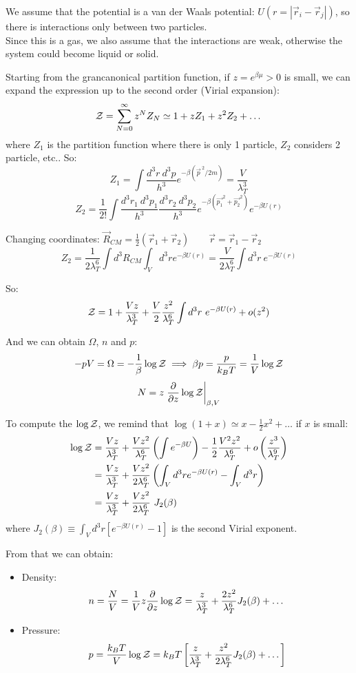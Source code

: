 We assume that the potential is a van der Waals potential: $U(r = |\vec r_i - \vec r_j|)$, so there is interactions only between two particles.\\
Since this is a gas, we also assume that the interactions are weak, otherwise the system could become liquid or solid.

Starting from the grancanonical partition function, if $z = e^{\beta \mu} > 0$ is small, we can expand the expression up to the second order (Virial expansion):
$$\mathcal{Z} = \sum_{N=0}^\infty z^N Z_N \simeq 1+ zZ_1 + z^2 Z_2 + \dots$$
where $Z_1$ is the partition function where there is only 1 particle, $Z_2$ considers 2 particle, etc.. So:
$$ Z_1 = \int \frac{d^3r\ d^3p}{h^3} e^{-\beta({\vec p}^{\ 2} / 2m)} = \frac V{\lambda_T^3}$$
$$ Z_2 = \frac1{2!}\int \frac{d^3r_1\ d^3p_1}{h^3}\frac{d^3r_2\ d^3p_2}{h^3} e^{-\beta (\vec{ p_1}^2 + \vec {p_2}^2)} e^{-\beta U(r)}$$

Changing coordinates: $\vec R_{CM} = \frac 12 (\vec r_1 + \vec r_2) \qquad \vec r = \vec r_1 - \vec r_2$
$$Z_2 = \frac 1{2\lambda_T^6} \int d^3 R_{CM}\int_V d^3 r e^{-\beta U(r)} = \frac V{2\lambda_T^6} \int d^3 r\ e^{-\beta U(r)}$$

So:
$$\mathcal{Z} = 1 + \frac {Vz}{\lambda_T^3} + \frac V2 \frac {z^2}{\lambda_T^6}\int d^3r\ e^{-\beta U(r)} + o(z^2)$$

And we can obtain $\Omega$, $n$ and $p$:
$$-pV = \Omega = -\frac1\beta \log \mathcal{Z} \implies \beta p = \frac p{k_BT} = \frac 1V \log \mathcal{Z}$$
$$N = z \left.\frac{\partial}{\partial z} \log \mathcal{Z}\right|_{\beta, V}$$

To compute the $\log \mathcal{Z}$, we remind that $\log (1+x) \simeq x-\frac12 x^2 + \dots$ if $x$ is small:
\begin{align*}
\log\mathcal{Z} &= \frac{Vz}{\lambda_T^3} + \frac {Vz^2}{\lambda_T^6}\left(\int e^{-\beta U}\right) - \frac 12 \frac {V^2 z^2}{\lambda_T^6} + o\left(\frac{z^3}{\lambda_T^9}\right) \\
&= \frac {Vz}{\lambda_T^3} + \frac {Vz^2}{2\lambda_T^6} \left(\int_V d^3r e^{-\beta U(r)} - \int_V d^3r\right) \\
&= \frac{Vz}{\lambda_T^3} + \frac{Vz^2}{2\lambda_T^6} \ J_2(\beta)
\end{align*}
where $J_2(\beta) \equiv \int_V d^3 r \left[e^{-\beta U(r)} - 1\right]$ is the second Virial exponent.

From that we can obtain:
\begin{itemize}
    \item Density: 
    \begin{equation}\label{eq:density}
        n = \frac NV = \frac 1V z \frac{\partial}{\partial z} \log \mathcal{Z} = \frac z{\lambda_T^3} + \frac {2z^2}{\lambda_T^6} J_2(\beta) + \dots
    \end{equation}
    \item Pressure: 
    \begin{equation}\label{eq:pressure}
        p = \frac{k_BT}V \log \mathcal{Z} = k_BT \left[ \frac{z}{\lambda_T^3} + \frac {z^2}{2\lambda_T^6}J_2(\beta) + \dots\right]
    \end{equation}
\end{itemize}


